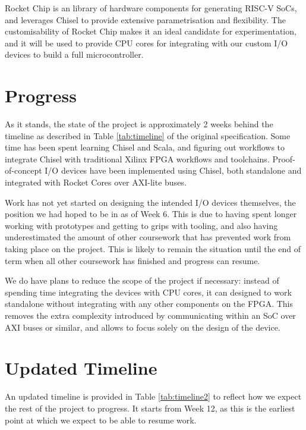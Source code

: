 \documentclass[a4paper,fleqn,12pt]{article}
\begin{document}
Rocket Chip is an library of hardware components for generating RISC-V SoCs, and leverages Chisel to provide extensive parametrisation and flexibility. The customisability of Rocket Chip makes it an ideal candidate for experimentation, and it will be used to provide CPU cores for integrating with our custom I/O devices to build a full microcontroller.

\section{Progress}

As it stands, the state of the project is approximately 2 weeks behind the timeline as described in Table \ref{tab:timeline} of the original specification. Some time has been spent learning Chisel and Scala, and figuring out workflows to integrate Chisel with traditional Xilinx FPGA workflows and toolchains. Proof-of-concept I/O devices have been implemented using Chisel, both standalone and integrated with Rocket Cores over AXI-lite buses.

Work has not yet started on designing the intended I/O devices themselves, the position we had hoped to be in as of Week 6. This is due to having spent longer working with prototypes and getting to grips with tooling, and also having underestimated the amount of other coursework that has prevented work from taking place on the project. This is likely to remain the situation until the end of term when all other coursework has finished and progress can resume.

We do have plans to reduce the scope of the project if necessary: instead of spending time integrating the devices with CPU cores, it can designed to work standalone without integrating with any other components on the FPGA. This removes the extra complexity introduced by communicating within an SoC over AXI buses or similar, and allows to focus solely on the design of the device.

\section{Updated Timeline}

An updated timeline is provided in Table \ref{tab:timeline2} to reflect how we expect the rest of the project to progress. It starts from Week 12, as this is the earliest point at which we expect to be able to resume work.
\end{document}
